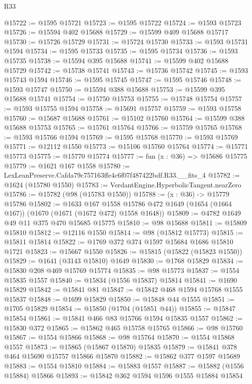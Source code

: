 \begin{lexlean}{R33}
\begin{coremodule}
@15722 := @1595 @15721
@15723 := @1595 @15722
@15724 := @1593 @15723
@15726 := @15594 @402 @15688
@15729 := @15599 @409 @15688 @15717
@15730 := @15726 @15729
@15731 := @15724 @15730
@15733 := @1593 @15731 @1594
@15734 := @1595 @15733
@15735 := @1595 @15734
@15736 := @1593 @15735
@15738 := @15594 @395 @15688
@15741 := @15599 @402 @15688 @15729
@15742 := @15738 @15741
@15743 := @15736 @15742
@15745 := @1593 @15743 @1594
@15746 := @1595 @15745
@15747 := @1595 @15746
@15748 := @1593 @15747
@15750 := @15594 @388 @15688
@15753 := @15599 @395 @15688 @15741
@15754 := @15750 @15753
@15755 := @15748 @15754
@15757 := @1593 @15755 @1594
@15758 := @15691 @15757
@15759 := @1593 @15758
@15760 := @15687 @15688
@15761 := @15102 @15760
@15764 := @15599 @388 @15688 @15753
@15765 := @15761 @15764
@15766 := @15759 @15765
@15768 := @1593 @15766 @1594
@15769 := @1595 @15768
@15770 := @1593 @15769
@15771 := @12112 @1550
@15773 := @15106 @15760 @15764
@15774 := @15771 @15773
@15775 := @15770 @15774
@15777 := fun (x : @36) => @15686 @15775
@15779 := @1621 @167 @1558
@15780 := LexLeanPreserve.Cafda79c757163ffe4c6f07f487422bdf.R33.__fits_4
@15782 := @1624 (@15780 @1550)
@15783 := VerdantEngine.HyperbolicTangent.nearZero
@15786 := @15782 (@98 (@15783 @1550))
@15788 := (x : @36) -> @15779 @15786
@15802 := @1633
    @167
    @1558
    @15786
    @472
    @1649
    (@1654 (@1664 @167))
    (@1670 (@1671 (@1672 @472) @1558 @1648))
@15809 := @4782 @1649 @49 @11 @375 @470 @15685 @15775
@15810 := @98 @15688
@15811 := @15809 @15810
@15812 := @12116 @1550
@15814 := @98 (@15812 @15773)
@15815 := @15811 @15814
@15822 := @1769 @372 @374 @1597 @15684 @1686 @15810 @1721
@15823 := @15667 @1550
@15826 := @15815 (@15822 (@15823 @1550))
@15829 := @1641 (@3143 @15810) @1649
@15830 := @1768 @15829
@15834 := @15830 @208 @469 @15769 @15774
@15835 := @98 @15773
@15837 := @1554 @15835 @1557
@15840 := @15834 (@1556 @15837) @15814
@15841 := @1690 @15829
@15842 := @15841 @81
@15847 := @15842 @468 @1594 @15768 @1555 @15837
@15848 := @1699 @15829
@15850 := @15848 @44 @1555
@15851 := @1705 @15829
@15854 := @15850 (@1704 (@15851 @44))
@15855 := @15847 @15854
@15861 := @15841 @466 @83 @15766 @1594 @15835 @1557
@15862 := @15830 @372
@15865 := @15862 @465 @15758 @15765
@15866 := @98 @15760
@15867 := @1554 @15866
@15868 := @98 @15764
@15870 := @1554 @15868 @1557
@15873 := @15865 (@15867 @15870) @15835
@15879 := @15841 @378 @464 @15690 @15757 @15866 @15870
@15882 := @15862 @377 @1597 @15689
@15883 := @1554 @15810
@15884 := @15883 @1557
@15887 := @15882 (@1556 @15884) @15866
@15893 := @15842 @362 @1594 @1596 @1555 @15884 @15854

\end{coremodule}
\end{lexlean}
